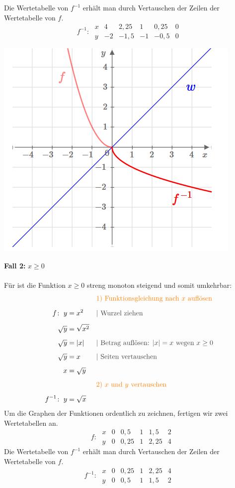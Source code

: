 \begin{multicols}{2}
    Die Wertetabelle von $f^{-1}$ erhält man durch Vertauschen der Zeilen der Wertetabelle von $f$.
    \[f^{-1}\colon\; \begin{array}{r|c|c|c|c|c} x & 4 & 2{,}25 & 1 & 0{,}25 & 0 \\ \hline y & -2 & -1{,}5 & -1 & -0{,}5 & 0 \end{array}\]
    \begin{center}
        \includegraphics[scale=0.7]{wurzelfunktion1}
    \end{center}
    \textbf{Fall 2:} $x \geq 0$\\~\\
    Für ist die Funktion $x \geq 0$ streng monoton steigend und somit umkehrbar:
    \begin{align*} & &&{\color{orange}\text{1) Funktionsgleichung nach $x$ auflösen}} \\[5px] f\colon\; y &= x^2 &&{\color{darkgray}| \text{ Wurzel ziehen}} \\[5px] \sqrt{y} &= \sqrt{x^2} \\[5px] \sqrt{y} &= |x| &&{\color{darkgray}| \text{ Betrag auflösen: } |x| = x \text{ wegen } x \geq 0} \\[5px] \sqrt{y} &= x &&{\color{darkgray}| \text{ Seiten vertauschen}} \\[5px] x &= \sqrt{y} \\[5px] & &&{\color{orange}\text{2) $x$ und $y$ vertauschen}} \\[5px] f^{-1}\colon\; y &= \sqrt{x} \end{align*}
    Um die Graphen der Funktionen ordentlich zu zeichnen, fertigen wir zwei Wertetabellen an.
    \[\phantom{^{-1}}f\colon\; \begin{array}{r|c|c|c|c|c} x & 0 & 0{,}5 & 1 & 1{,}5 & 2 \\ \hline y & 0 & 0{,}25 & 1 & 2{,}25 & 4 \end{array}\]
    Die Wertetabelle von $f^{-1}$ erhält man durch Vertauschen der Zeilen der Wertetabelle von $f$.
    \[f^{-1}\colon\; \begin{array}{r|c|c|c|c|c} x & 0 & 0{,}25 & 1 & 2{,}25 & 4 \\ \hline y & 0 & 0{,}5 & 1 & 1{,}5 & 2 \end{array}\]


\end{multicols}
